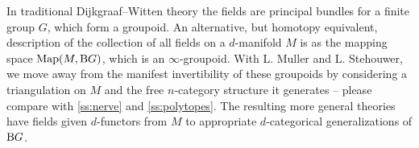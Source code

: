 In traditional Dijkgraaf--Witten theory the fields are principal bundles for a finite
group $G$, which form a groupoid.
An alternative, but homotopy equivalent, description of the collection of all fields on a $d$-manifold $M$ is as the mapping space $\mathrm{Map}(M, \mathrm{B} G)$, which is an $\infty$-groupoid.
With L. Muller and L. Stehouwer, we move away from the manifest invertibility of these groupoids by
considering a triangulation on $M$ and the free $n$-category structure it generates -- please compare with \cref{ss:nerve} and \cref{ss:polytopes}.
The resulting more general theories have fields given $d$-functors from $M$ to appropriate $d$-categorical generalizations of $\mathrm{B} G$.






